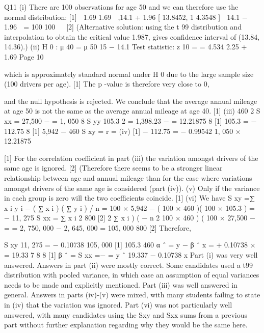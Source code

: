\documentclass[a4paper,12pt]{article}
\begin{document}

\newpage


Q11
(i)
There are 100 observations for age 50 and we can therefore use the normal distribution:
[1]

1.69
1.69 
,14.1 + 1.96
[ 13.8452, 1 4.3548 ]
 14.1 − 1.96
 =
100
100


[2]
(Alternative solution: using the t 99 distribution and interpolation to obtain the
critical value 1.987, gives confidence interval of (13.84, 14.36).)
(ii)
H 0 : μ 40 =
μ 50
15 − 14.1
Test
statistic: z 10
=
= 4.534
2.25 + 1.69
Page 10

which is approximately standard normal under H 0 due to the large sample
size (100 drivers per age).
[1]
The p -value is therefore very close to 0,

and the null hypothesis is rejected. We conclude that the average annual
mileage at age 50 is not the same as the average annual mileage at age 40. [1]
(iii)
460 2
S xx = 27,500 −
= 1, 050
8
S yy
105.3 2
= 1,398.23 −
= 12.21875
8 [1]
105.3
=
− 112.75
8 [1]
5,942 − 460
S xy =
r =
(iv)
[1]
− 112.75
= − 0.99542
1, 050 × 12.21875

[1]
For the correlation coefficient in part (iii) the variation amongst drivers of the
same age is ignored.
[2]
(Therefore there seems to be a stronger linear relationship between age and
annual mileage than for the case where variations amongst drivers of the same
age is considered (part (iv)).
(v) Only if the variance in each group is zero will the two coefficients coincide.
[1]
(vi) We have
S xy =∑ x i y i − ( ∑ x i ) ( ∑ y i ) / n = 100 × 5,942 −
( 100 × 460 )( 100 × 105.3 )
= − 11, 275
S xx =
∑ x i 2
800
[2]
2
∑ x i )
(
−
n
2
100 × 460 )
(
100 × 27,500 −
=
= 2, 750, 000 − 2, 645, 000 = 105, 000
800
[2]
Therefore,

S xy
11, 275
= − 0.10738
105, 000 [1]
105.3
460
α ˆ = y − β ˆ x =
+ 0.10738 ×
= 19.33 7
8
8 [1]
β ˆ =
S xx
=−
=
y ˆ 19.337 − 0.10738 x
Part (i) was very well answered. Answers in part (ii) were mostly correct. Some candidates used a t99 distribution with pooled variance, in which case an assumption of equal variances needs to be made and explicitly mentioned. Part (iii) was well answered in general. Answers in parts (iv)-(v) were mixed, with many students failing to state in (iv)
that the variation was ignored. Part (vi) was not particularly well answered, with many candidates using the Sxy and Sxx sums from a previous part without further explanation regarding why they would be the same here.

\end{document}
